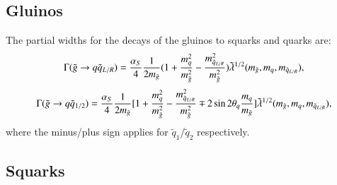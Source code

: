 \documentclass[final,3p,times,pdflatex]{elsarticle}
\begin{document}
\subsection{Gluinos} \label{Gluinos}
The partial widths for the decays of the gluinos to squarks and quarks are:
\begin{equation}\label{gluqqLR}
\Gamma(\tilde{g} \rightarrow q \tilde{q}_{L/R}) = {\alpha_{S} \over 4} {1 \over 2m_{\tilde{g}}} (1 + {m_{q}^2 \over m_{\tilde{g}}^2} - {m_{\tilde{q}_{L/R}}^2 \over m_{\tilde{g}}^2}) \tilde{\lambda}^{1/2} (m_{\tilde{g}}, m_q, m_{\tilde{q}_{L/R}}), 
\end{equation} 
\begin{equation}\label{gluqq12}
\Gamma(\tilde{g} \rightarrow q \tilde{q}_{1/2}) = {\alpha_{S} \over 4} {1 \over 2m_{\tilde{g}}} [1 + {m_{q}^2 \over m_{\tilde{g}}^2} - {m_{\tilde{q}_{L/R}}^2 \over m_{\tilde{g}}^2} \mp 2\sin2\theta_q {m_q \over m_{\tilde{g}}}]  \tilde{\lambda}^{1/2} (m_{\tilde{g}}, m_q, m_{\tilde{q}_{L/R}}),
\end{equation} 
where the minus/plus sign applies for $\tilde{q}_1$/$\tilde{q}_2$ respectively.

\subsection{Squarks} \label{Squarks}
\end{document}

